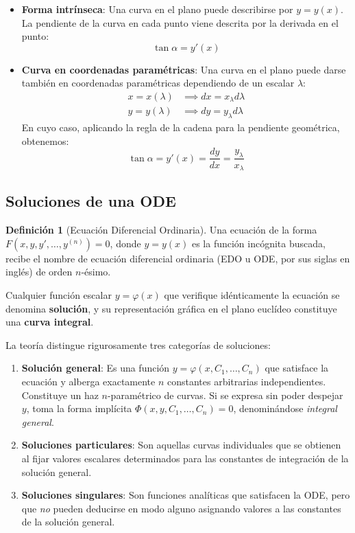 \documentclass[11pt,a4paper]{article}
\theoremstyle{definition}
\newtheorem{definition}{Definición}[section]
\theoremstyle{plain}
\begin{document}
\begin{itemize}
    \item \textbf{Forma intrínseca}: Una curva en el plano puede describirse por $y = y(x)$. La pendiente de la curva en cada punto viene descrita por la derivada en el punto:
    $$ \tan \alpha = y'(x) $$
    
    \item \textbf{Curva en coordenadas paramétricas}: Una curva en el plano puede darse también en coordenadas paramétricas dependiendo de un escalar $\lambda$:
    \begin{align*}
        x = x(\lambda) &\implies dx = x_\lambda d\lambda \\
        y = y(\lambda) &\implies dy = y_\lambda d\lambda
    \end{align*}
    En cuyo caso, aplicando la regla de la cadena para la pendiente geométrica, obtenemos:
    $$ \tan \alpha = y'(x) = \frac{dy}{dx} = \frac{y_\lambda}{x_\lambda} $$
\end{itemize}

\subsection{Soluciones de una ODE}

\begin{definition}[Ecuación Diferencial Ordinaria]
Una ecuación de la forma $F(x, y, y', \dots, y^{(n)}) = 0$, donde $y = y(x)$ es la función incógnita buscada, recibe el nombre de ecuación diferencial ordinaria (EDO u ODE, por sus siglas en inglés) de orden $n$-ésimo.
\end{definition}

Cualquier función escalar $y = \varphi(x)$ que verifique idénticamente la ecuación se denomina \textbf{solución}, y su representación gráfica en el plano euclídeo constituye una \textbf{curva integral}.

La teoría distingue rigurosamente tres categorías de soluciones:
\begin{enumerate}
    \item \textbf{Solución general}: Es una función $y = \varphi(x, C_1, \dots, C_n)$ que satisface la ecuación y alberga exactamente $n$ constantes arbitrarias independientes. Constituye un haz $n$-paramétrico de curvas. Si se expresa sin poder despejar $y$, toma la forma implícita $\Phi(x, y, C_1, \dots, C_n) = 0$, denominándose \textit{integral general}.
    \item \textbf{Soluciones particulares}: Son aquellas curvas individuales que se obtienen al fijar valores escalares determinados para las constantes de integración de la solución general.
    \item \textbf{Soluciones singulares}: Son funciones analíticas que satisfacen la ODE, pero que \textit{no} pueden deducirse en modo alguno asignando valores a las constantes de la solución general.
\end{enumerate}
\end{document}
